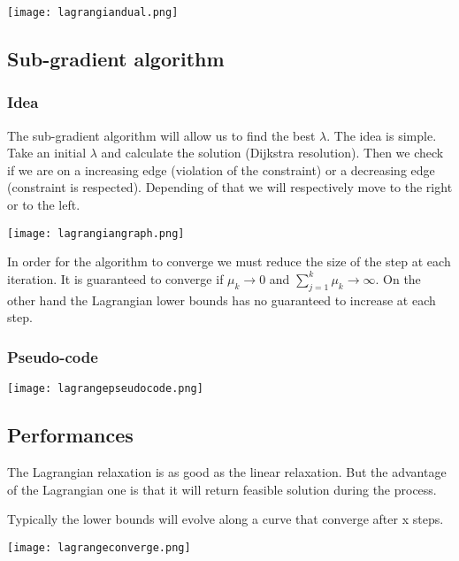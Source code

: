\centerline{\texttt{[image: lagrangiandual.png]}}

\subsection{Sub-gradient algorithm}

\subsubsection{Idea}

The sub-gradient algorithm will allow us to find the best $\lambda$. The idea is simple. Take an initial $\lambda$ and calculate the solution (Dijkstra resolution). Then we check if we are on a increasing edge (violation of the constraint) or a decreasing edge (constraint is respected). Depending of that we will respectively move to the right or to the left.

\centerline{\texttt{[image: lagrangiangraph.png]}}

In order for the algorithm to converge we must reduce the size of the step at each iteration. It is guaranteed to converge if $\mu_{k} \rightarrow 0$ and $\sum^{k}_{j=1} \mu_{k} \rightarrow \infty$.
On the other hand the Lagrangian lower bounds has no guaranteed to increase at each step.

\subsubsection{Pseudo-code}

\centerline{\texttt{[image: lagrangepseudocode.png]}}

\subsection{Performances}

The Lagrangian relaxation is as good as the linear relaxation. But the advantage of the Lagrangian one is that it will return feasible solution during the process.

Typically the lower bounds will evolve along a curve that converge after x steps.

\centerline{\texttt{[image: lagrangeconverge.png]}}